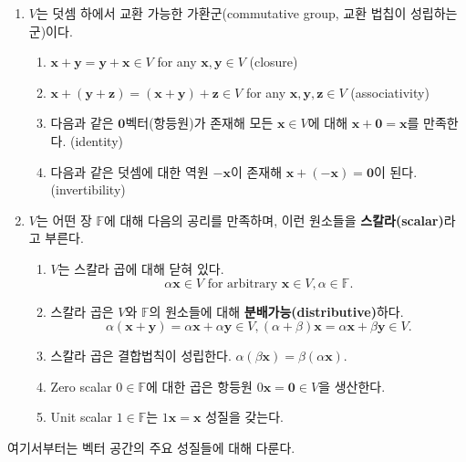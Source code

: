 \documentclass[b5paper,]{scrbook}
\providecommand{\tightlist}{%
  \setlength{\itemsep}{0pt}\setlength{\parskip}{0pt}}
\theoremstyle{plain}
\theoremstyle{definition}
\numberwithin{equation}{section}
\begin{document}
\begin{enumerate}
\def\labelenumi{\arabic{enumi}.}
\tightlist
\item
  \(V\)는 덧셈 하에서 교환 가능한 가환군(commutative group, 교환 법칩이 성립하는 군)이다.

  \begin{enumerate}
  \def\labelenumii{\roman{enumii}.}
  \tightlist
  \item
    \(\mathbf{x}+\mathbf{y}=\mathbf{y}+\mathbf{x}\in V\) for any \(\mathbf{x},\mathbf{y}\in V\) (closure)
  \item
    \(\mathbf{x} + (\mathbf{y}+\mathbf{z}) = (\mathbf{x} + \mathbf{y}) + \mathbf{z}\in V\) for any \(\mathbf{x},\mathbf{y}, \mathbf{z}\in V\) (associativity)
  \item
    다음과 같은 \(\mathbf{0}\)벡터(항등원)가 존재해 모든 \(\mathbf{x}\in V\)에 대해 \(\mathbf{x}+\mathbf{0}=\mathbf{x}\)를 만족한다. (identity)
  \item
    다음과 같은 덧셈에 대한 역원 \(-\mathbf{x}\)이 존재해 \(\mathbf{x}+(-\mathbf{x})=\mathbf{0}\)이 된다. (invertibility)
  \end{enumerate}
\item
  \(V\)는 어떤 장 \(\mathbb{F}\)에 대해 다음의 공리를 만족하며, 이런 원소들을 \textbf{스칼라(scalar)}라고 부른다.

  \begin{enumerate}
  \def\labelenumii{\roman{enumii}.}
  \tightlist
  \item
    \(V\)는 스칼라 곱에 대해 닫혀 있다.
    \[\alpha \mathbf{x} \in V \text{ for arbitrary } \mathbf{x} \in V, \alpha \in \mathbb{F}.\]
  \item
    스칼라 곱은 \(V\)와 \(\mathbb{F}\)의 원소들에 대해 \textbf{분배가능(distributive)}하다.
    \[\alpha(\mathbf{x}+\mathbf{y})=\alpha\mathbf{x}+ \alpha\mathbf{y}\in V, (\alpha+\beta)\mathbf{x}=\alpha\mathbf{x}+\beta\mathbf{y}\in V.\]
  \item
    스칼라 곱은 결합법칙이 성립한다. \(\alpha(\beta\mathbf{x})=\beta(\alpha \mathbf{x}).\)
  \item
    Zero scalar \(0\in\mathbb{F}\)에 대한 곱은 항등원 \(0\mathbf{x}=\mathbf{0}\in V\)을 생산한다.
  \item
    Unit scalar \(1 \in \mathbb{F}\)는 \(1\mathbf{x}=\mathbf{x}\) 성질을 갖는다.
  \end{enumerate}
\end{enumerate}

여기서부터는 벡터 공간의 주요 성질들에 대해 다룬다.
\end{document}
